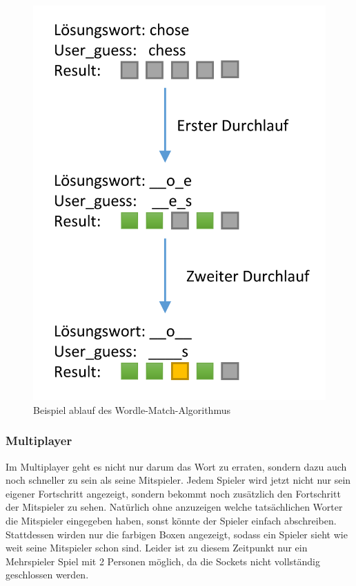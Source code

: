 \documentclass[a4paper]{article}
\begin{document}
                \begin{figure}[t]
                    \includegraphics{images/WordleAlgo.png}
                    \centering
                    \caption{Beispiel ablauf des Wordle-Match-Algorithmus}
                \end{figure}
                
            \pagebreak
            \subsubsection{Multiplayer}
                Im Multiplayer geht es nicht nur darum das Wort zu erraten, sondern dazu auch noch schneller zu sein als seine Mitspieler.
                Jedem Spieler wird jetzt nicht nur sein eigener Fortschritt angezeigt, sondern bekommt noch zusätzlich den Fortschritt der Mitspieler zu sehen. Natürlich ohne anzuzeigen welche tatsächlichen Worter die Mitspieler eingegeben haben, sonst könnte der Spieler einfach abschreiben. Stattdessen wirden nur die farbigen Boxen angezeigt, sodass ein Spieler sieht wie weit seine Mitspieler schon sind.
                Leider ist zu diesem Zeitpunkt nur ein Mehrspieler Spiel mit 2 Personen möglich, da die Sockets nicht vollständig geschlossen werden.
                
\end{document}
